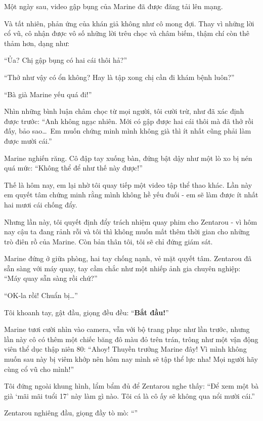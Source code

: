\documentclass[../main.tex]{subfiles}
\begin{document}
Một ngày sau, video gập bụng của Marine đã được đăng tải lên mạng.

Và tất nhiên, phản ứng của khán giả không như cô mong đợi. Thay vì những lời cổ vũ, cô nhận được vô số những lời trêu chọc và châm biếm, thậm chí còn thê thảm hơn, dạng như:

``Ủa? Chị gập bụng có hai cái thôi hả?''

``Thở như vậy có ổn không? Hay là tập xong chị cần đi khám bệnh luôn?''

``Bà già Marine yếu quá đi!''

Nhìn những bình luận châm chọc từ mọi người, tôi cười trừ, như đã xác định được trước: ``Anh không ngạc nhiên. Mới có gập được hai cái thôi mà đã thở rồi đấy, bảo sao\dots\ Em muốn chứng minh mình không già thì ít nhất cũng phải làm được mười cái.''

Marine nghiến răng. Cô đập tay xuống bàn, đứng bật dậy như một lò xo bị nén quá mức: ``Không thể để như thế này được!''

Thế là hôm nay, em lại nhờ tôi quay tiếp một video tập thể thao khác. Lần này em quyết tâm chứng minh rằng mình không hề yếu đuối - em sẽ làm được ít nhất hai mươi cái chống đẩy.

Nhưng lần này, tôi quyết định đẩy trách nhiệm quay phim cho Zentarou - vì hôm nay cậu ta đang rảnh rỗi và tôi thì không muốn mất thêm thời gian cho những trò điên rồ của Marine. Còn bản thân tôi, tôi sẽ chỉ đứng giám sát.

\ct

Marine đứng ở giữa phòng, hai tay chống nạnh, vẻ mặt quyết tâm. Zentarou đã sẵn sàng với máy quay, tay cầm chắc như một nhiếp ảnh gia chuyên nghiệp: ``Máy quay sẵn sàng rồi chứ?''

``OK-la rồi! Chuẩn bị\dots''

Tôi khoanh tay, gật đầu, giọng đều đều: ``\textbf{Bắt đầu!}''

\il

Marine tươi cười nhìn vào camera, vẫn với bộ trang phục như lần trước, nhưng lần này cô có thêm một chiếc băng đô màu đỏ trên trán, trông như một vận động viên thể dục thập niên 80: ``Ahoy! Thuyền trưởng Marine đây! Vì mình không muốn sau này bị viêm khớp nên hôm nay mình sẽ tập thể lực nha! Mọi người hãy cùng cổ vũ cho mình!''

Tôi đứng ngoài khung hình, lẩm bẩm đủ để Zentarou nghe thấy: ``Để xem một bà già `mãi mãi tuổi 17' này làm gì nào. Tôi cá là cô ấy sẽ không qua nổi mười cái.''

Zentarou nghiêng đầu, giọng đầy tò mò: ``''
\end{document}
